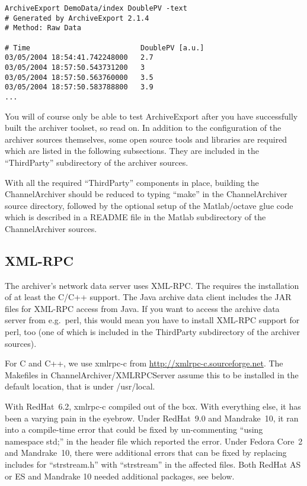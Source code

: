 \begin{lstlisting}[keywordstyle=\sffamily]
ArchiveExport DemoData/index DoublePV -text
# Generated by ArchiveExport 2.1.4
# Method: Raw Data

# Time                          DoublePV [a.u.]
03/05/2004 18:54:41.742248000   2.7
03/05/2004 18:57:50.543731200   3
03/05/2004 18:57:50.563760000   3.5
03/05/2004 18:57:50.583788800   3.9
...
\end{lstlisting}

\noindent You will of course only be able to test ArchiveExport after you
have successfully built the archiver toolset, so read on.
In addition to the configuration of the archiver sources
themselves, some open source tools and libraries are required which
are listed in the following subsections. They are included in the
``ThirdParty'' subdirectory of the archiver sources.

With all the required ``ThirdParty'' components in place, building the
ChannelArchiver should be reduced to typing ``make'' in the
ChannelArchiver source directory, followed by the optional setup of the
Matlab/octave glue code which is described in a README file in the
Matlab subdirectory of the ChannelArchiver sources.

\subsection{XML-RPC}
The archiver's network data server uses XML-RPC. The  requires the installation of at least the C/C++ support. The
Java archive data client includes the JAR files for XML-RPC access
from Java. If you want to access the archive data server from e.g.\ perl,
this would mean you have to install XML-RPC support for perl, too
(one of which is included in the ThirdParty subdirectory of the
archiver sources).

For C and C++, we use xmlrpc-c from
\href{http://xmlrpc-c.sourceforge.net}{http://xmlrpc-c.sourceforge.net}.
The Makefiles in ChannelArchiver/XMLRPCServer assume this to be
installed in the default location, that is under /usr/local.

With RedHat~6.2, xmlrpc-c compiled out of the box.  With everything else,
it has been a varying pain in the eyebrow. Under RedHat~9.0
and Mandrake~10, it ran into a compile-time error that could be fixed
by un-commenting ``using namespace std;'' in the header file which
reported the error.  Under Fedora Core~2 and Mandrake~10, there were
additional errors that can be fixed by replacing includes for
``strstream.h'' with ``strstream'' in the affected files.  Both RedHat
AS or ES and Mandrake 10 needed additional packages, see below.

